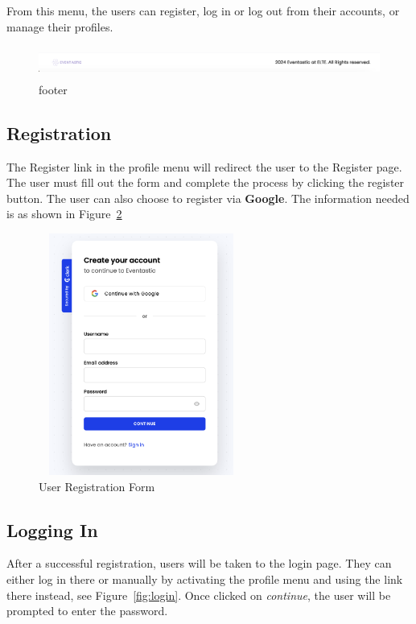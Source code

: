 From this menu, the users can register, log in or log out from their accounts, or
manage their profiles.

\begin{figure}[H]
	\centering
	\includegraphics[width=1.0\textwidth,height=40px,frame]{images/footer.png}
	\caption{footer}
        \label{fig:footer}
\end{figure}

\subsection{Registration}

The Register link in the profile menu will redirect the user to the Register page.
The user must fill out the form and complete the process by clicking the register
button. The user can also choose to register via \textbf{Google}. The information needed is as shown in Figure~\ref{fig:register}

\begin{figure}[H]
	\centering	\includegraphics[width=0.6\textwidth,height=300px,frame]{images/register.png}
	\caption{User Registration Form}
        \label{fig:register}
\end{figure}


\subsection{Logging In}


After a successful registration, users will be taken to the login page. They can
either log in there or manually by activating the profile menu and using the link
there instead, see Figure~\ref{fig:login}. Once clicked on \textit{continue}, the user will be prompted to enter the password.

